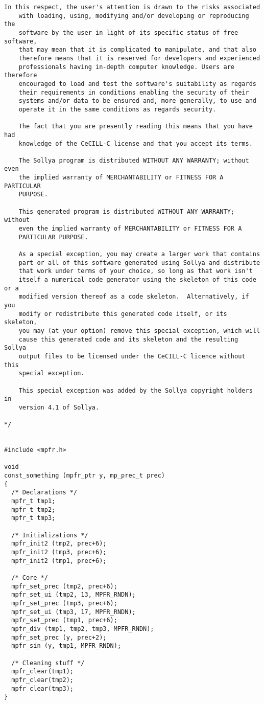 \begin{center}
\begin{minipage}{15cm}
\begin{Verbatim}[frame=single]
    In this respect, the user's attention is drawn to the risks associated
    with loading, using, modifying and/or developing or reproducing the
    software by the user in light of its specific status of free software,
    that may mean that it is complicated to manipulate, and that also
    therefore means that it is reserved for developers and experienced
    professionals having in-depth computer knowledge. Users are therefore
    encouraged to load and test the software's suitability as regards
    their requirements in conditions enabling the security of their
    systems and/or data to be ensured and, more generally, to use and
    operate it in the same conditions as regards security.
    
    The fact that you are presently reading this means that you have had
    knowledge of the CeCILL-C license and that you accept its terms.
    
    The Sollya program is distributed WITHOUT ANY WARRANTY; without even
    the implied warranty of MERCHANTABILITY or FITNESS FOR A PARTICULAR
    PURPOSE.
    
    This generated program is distributed WITHOUT ANY WARRANTY; without
    even the implied warranty of MERCHANTABILITY or FITNESS FOR A
    PARTICULAR PURPOSE.
    
    As a special exception, you may create a larger work that contains
    part or all of this software generated using Sollya and distribute
    that work under terms of your choice, so long as that work isn't
    itself a numerical code generator using the skeleton of this code or a
    modified version thereof as a code skeleton.  Alternatively, if you
    modify or redistribute this generated code itself, or its skeleton,
    you may (at your option) remove this special exception, which will
    cause this generated code and its skeleton and the resulting Sollya
    output files to be licensed under the CeCILL-C licence without this
    special exception.
    
    This special exception was added by the Sollya copyright holders in
    version 4.1 of Sollya.
    
*/


#include <mpfr.h>

void
const_something (mpfr_ptr y, mp_prec_t prec)
{
  /* Declarations */
  mpfr_t tmp1;
  mpfr_t tmp2;
  mpfr_t tmp3;

  /* Initializations */
  mpfr_init2 (tmp2, prec+6);
  mpfr_init2 (tmp3, prec+6);
  mpfr_init2 (tmp1, prec+6);

  /* Core */
  mpfr_set_prec (tmp2, prec+6);
  mpfr_set_ui (tmp2, 13, MPFR_RNDN);
  mpfr_set_prec (tmp3, prec+6);
  mpfr_set_ui (tmp3, 17, MPFR_RNDN);
  mpfr_set_prec (tmp1, prec+6);
  mpfr_div (tmp1, tmp2, tmp3, MPFR_RNDN);
  mpfr_set_prec (y, prec+2);
  mpfr_sin (y, tmp1, MPFR_RNDN);

  /* Cleaning stuff */
  mpfr_clear(tmp1);
  mpfr_clear(tmp2);
  mpfr_clear(tmp3);
}

\end{Verbatim}
\end{minipage}\end{center}
